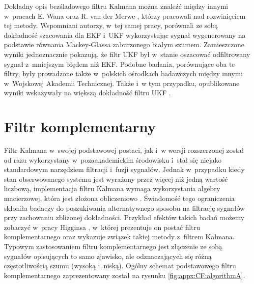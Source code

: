 		
Dokładny opis bezśladowego filtru Kalmana można znaleźć między innymi w~pracach E. Wana oraz R. van der Merwe \cite{Wan2000, Wan2001}, którzy pracowali nad rozwinięciem tej metody. Wspomniani autorzy, w~tej samej pracy, porównali ze sobą dokładność szacowania dla EKF i~UKF wykorzystując sygnał wygenerowany na podstawie równania Mackey-Glassa \cite{Glass2010} zaburzonego białym szumem. Zamieszczone wyniki jednoznacznie pokazują, że filtr UKF był w~stanie oszacować odfiltrowany sygnał z~mniejszym błędem niż EKF. Podobne badania, porównujące oba te filtry, były prowadzone także w~polskich ośrodkach badawczych między innymi w~Wojskowej Akademii Technicznej. Także i~w tym przypadku, opublikowane wyniki wskazywały na większą dokładność filtru UKF \cite{Konatowski2007, Konatowski2007a}.
		
\section*{Filtr komplementarny}\label{sec:appx:filters:CF}
Filtr Kalmana w~swojej podstawowej postaci, jak i~w wersji rozszerzonej został od razu wykorzystany w~pozaakademickim środowisku i~stał się niejako standardowym narzędziem filtracji i~fuzji sygnałów. Jednak w~przypadku kiedy stan obserwowanego systemu jest wyrażony przez więcej niż jedną wartość liczbową, implementacja filtru Kalmana wymaga wykorzystania algebry macierzowej, która jest złożona obliczeniowo \cite{wiki:MatrixAlgebraComplexity2016}. Świadomość tego ograniczenia skłoniła badaczy do poszukiwania alternatywnego sposobu na filtrację sygnałów przy zachowaniu zbliżonej dokładności. Przykład efektów takich badań możemy zobaczyć w~pracy Higginsa \cite{Higgins1975}, w~której prezentuje on postać filtru komplementarnego oraz wykazuje związek takiej metody z~filtrem Kalmana. Typowym zastosowaniem filtru komplementarnego jest złączenie ze sobą sygnałów opisujących to samo zjawisko, ale odznaczających się różną częstotliwością szumu (wysoką i~niską). Ogólny schemat podstawowego filtru komplementarnego zaprezentowany został na rysunku \ref{fig:appx:CF:algorithmA}.
		
\newcommand{\suma}{\Large$+$}
\newcommand{\inte}{$\displaystyle \int$}
\newcommand{\derv}{\huge$\frac{d}{dt}$}
		
